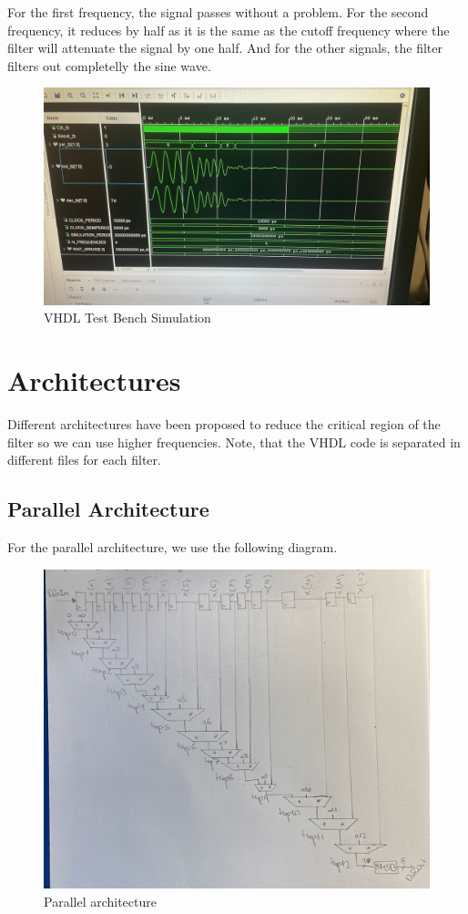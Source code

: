 \documentclass[a4paper, 12pt]{article}
\begin{document}
For the first frequency, the signal passes without a problem. For the second frequency, it reduces by half as it is the same as the cutoff frequency where the filter will attenuate the signal by one half. And for the other signals, the filter filters out completelly the sine wave.

\begin{figure}[htbp]
\centering
\includegraphics[width=.9\linewidth]{./img/simulation.jpg}
\caption{VHDL Test Bench Simulation}
\end{figure}
\section{Architectures}
\label{sec:orgf9ac256}

Different architectures have been proposed to reduce the critical region of the filter so we can use higher frequencies. Note, that the VHDL code is separated in different files for each filter.
\subsection{Parallel Architecture}
\label{sec:orge1207ce}

For the parallel architecture, we use the following diagram.

\begin{figure}[htbp]
\centering
\includegraphics[width=.9\linewidth]{./img/architecture_parallel.jpg}
\caption{Parallel architecture}
\end{figure}
\end{document}
